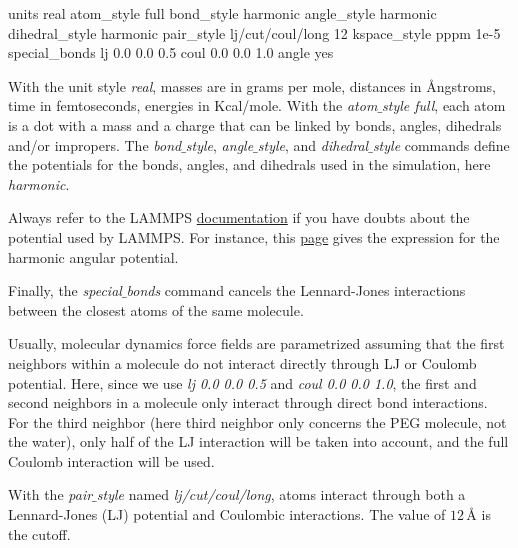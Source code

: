 \begin{lcverbatim}
units real
atom_style full
bond_style harmonic
angle_style harmonic
dihedral_style harmonic
pair_style lj/cut/coul/long 12
kspace_style pppm 1e-5
special_bonds lj 0.0 0.0 0.5 coul 0.0 0.0 1.0 angle yes
\end{lcverbatim}

\noindent With the unit style \textit{real}, masses are in grams per
mole, distances in Ångstroms, time in femtoseconds, energies
in Kcal/mole. With the \textit{atom$\_$style full}, each atom is a dot
with a mass and a charge that can be
linked by bonds, angles, dihedrals and/or impropers. The \textit{bond$\_$style},
\textit{angle$\_$style}, and \textit{dihedral$\_$style} commands define the
potentials for the bonds, angles, and dihedrals used in the simulation,
here \textit{harmonic}.

\vspace{0.25cm} \noindent Always refer to the LAMMPS \href{https://docs.lammps.org/}{documentation} if you have doubts about the
potential used by LAMMPS. For instance, this \href{https://docs.lammps.org/angle_harmonic.html}{page}
gives the expression for the harmonic angular potential.

\vspace{0.25cm} \noindent Finally, the \textit{special$\_$bonds} command cancels the
Lennard-Jones interactions between the closest
atoms of the same molecule.

\begin{tcolorbox}[colback=mylightblue!5!white,colframe=mylightblue!75!black,title=About *special bonds*]

\vspace{0.25cm} \noindent Usually, molecular dynamics force fields are parametrized assuming that
the first neighbors within a molecule do not
interact directly through LJ or Coulomb potential. Here, since we
use \textit{lj 0.0 0.0 0.5} and \textit{coul 0.0 0.0 1.0}, the first and second
neighbors in a molecule only interact through direct bond interactions.
For the third neighbor (here third neighbor only concerns the PEG molecule,
not the water), only half of the LJ interaction will be taken into account,
and the full Coulomb interaction will be used.   
\end{tcolorbox}

\noindent With the \textit{pair$\_$style} named \textit{lj/cut/coul/long}, atoms
interact through both a Lennard-Jones (LJ) potential and
Coulombic interactions. The value of $12\,\text{Å}$ is 
the cutoff.

